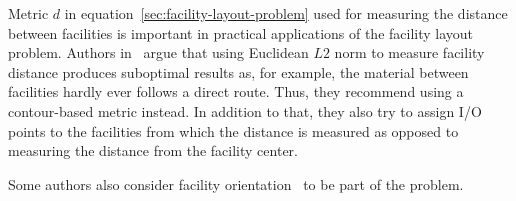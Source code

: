 Metric $d$ in equation~\ref{sec:facility-layout-problem} used for measuring the distance between facilities is important in practical applications of the facility layout problem.
Authors in~\cite{friedrichIntegratedSlicingTree2018} argue that using Euclidean $L2$ norm
to measure facility distance produces suboptimal results as, for example, the material between facilities
hardly ever follows a direct route.
Thus, they recommend using a contour-based metric instead.
In addition to that, they also try to assign I/O points to the facilities from which the distance is measured as opposed to measuring the distance from the facility center.

Some authors also consider facility orientation~\cite{liuMultiobjectiveParticleSwarm2018, tamHierarchicalApproachFacility1991}
to be part of the problem.










